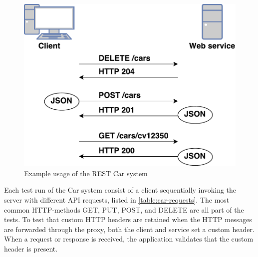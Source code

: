 \begin{figure}[h]
\centering
\includegraphics[scale=0.6]{images/rest_flow.pdf}
\caption{Example usage of the REST Car system}
\label{figure-rest-flow}
\end{figure}

Each test run of the Car system consist of a client sequentially invoking the
server with different API requests, listed in \cref{table:car-requests}. The
most common HTTP-methods GET, PUT, POST, and DELETE are all part of the tests.
To test that custom HTTP headers are retained when the HTTP messages are
forwarded through the proxy, both the client and service set a custom header.
When a request or response is received, the application validates that the
custom header is present.




